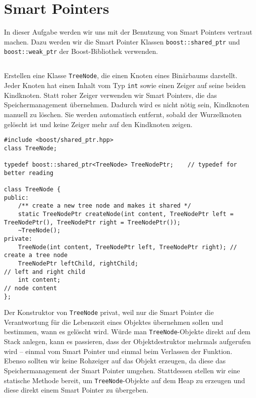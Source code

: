 \section{Smart Pointers}
In dieser Aufgabe werden wir uns mit der Benutzung von Smart Pointers vertraut machen. Dazu werden wir die Smart Pointer Klassen \texttt{boost::shared\_ptr} und \texttt{boost::weak\_ptr} der Boost-Bibliothek verwenden.

\subsection{}
Erstellen eine Klasse \texttt{TreeNode}, die einen Knoten eines Binärbaums darstellt.
Jeder Knoten hat einen Inhalt vom Typ \texttt{int} sowie einen Zeiger auf seine beiden Kindknoten.
Statt \glqq roher\grqq{} Zeiger verwenden wir Smart Pointers, die das Speichermanagement übernehmen.
Dadurch wird es nicht nötig sein, Kindknoten manuell zu löschen.
Sie werden automatisch entfernt, sobald der Wurzelknoten gelöscht ist und keine Zeiger mehr auf den Kindknoten zeigen.

\begin{lstlisting}
#include <boost/shared_ptr.hpp>
class TreeNode;

typedef boost::shared_ptr<TreeNode> TreeNodePtr;	// typedef for better reading

class TreeNode {
public:
	/** create a new tree node and makes it shared */
	static TreeNodePtr createNode(int content, TreeNodePtr left = TreeNodePtr(), TreeNodePtr right = TreeNodePtr());
	~TreeNode();
private:
	TreeNode(int content, TreeNodePtr left, TreeNodePtr right);	// create a tree node
	TreeNodePtr leftChild, rightChild;									// left and right child
	int content;																// node content
};
\end{lstlisting}

Der Konstruktor von \texttt{TreeNode} privat, weil nur die Smart Pointer die Verantwortung für die Lebenszeit eines Objektes übernehmen sollen und bestimmen, wann es gelöscht wird.
Würde man \texttt{TreeNode}-Objekte direkt auf dem Stack anlegen, kann es passieren, dass der Objektdestruktor mehrmals aufgerufen wird -- einmal vom Smart Pointer und einmal beim Verlassen der Funktion.
Ebenso sollten wir keine Rohzeiger auf das Objekt erzeugen, da diese das Speichermanagement der Smart Pointer umgehen.
Stattdessen stellen wir eine statische Methode bereit, um \texttt{TreeNode}-Objekte auf dem Heap zu erzeugen und diese direkt einem Smart Pointer zu übergeben.

